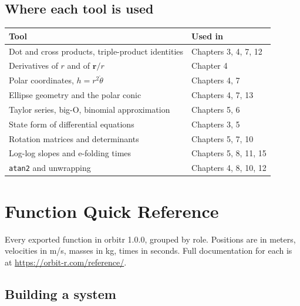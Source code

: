 \documentclass[
  10.5pt,
  letterpaper,
]{scrbook}
\newcounter{none} %
\theoremstyle{definition}
\theoremstyle{plain}
\theoremstyle{remark}
\begin{document}
\section{Where each tool is used}\label{where-each-tool-is-used}

{\def\LTcaptype{none} %
\begin{longtable}[]{@{}
  >{\raggedright\arraybackslash}p{}
  >{\raggedright\arraybackslash}p{}@{}}
\toprule\noalign{}
\begin{minipage}[b]{\linewidth}\raggedright
Tool
\end{minipage} & \begin{minipage}[b]{\linewidth}\raggedright
Used in
\end{minipage} \\
\midrule\noalign{}
\endhead
\bottomrule\noalign{}
\endlastfoot
Dot and cross products, triple-product identities & Chapters 3, 4, 7,
12 \\
Derivatives of \(r\) and of \(\mathbf{r}/r\) & Chapter 4 \\
Polar coordinates, \(h = r^2\dot\theta\) & Chapters 4, 7 \\
Ellipse geometry and the polar conic & Chapters 4, 7, 13 \\
Taylor series, big-O, binomial approximation & Chapters 5, 6 \\
State form of differential equations & Chapters 3, 5 \\
Rotation matrices and determinants & Chapters 5, 7, 10 \\
Log-log slopes and e-folding times & Chapters 5, 8, 11, 15 \\
\texttt{atan2} and unwrapping & Chapters 4, 8, 10, 12 \\
\end{longtable}
}

\chapter{Function Quick Reference}\label{sec-function-reference}

Every exported function in orbitr 1.0.0, grouped by role. Positions are
in meters, velocities in m/s, masses in kg, times in seconds. Full
documentation for each is at \url{https://orbit-r.com/reference/}.

\section{Building a system}\label{building-a-system}
\end{document}
